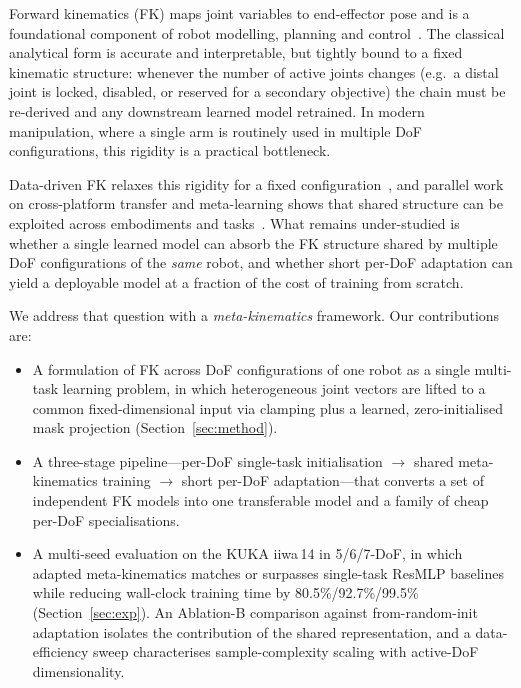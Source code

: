 \documentclass[conference]{IEEEtran}
\begin{document}
Forward kinematics (FK) maps joint variables to end-effector pose and is a foundational component of robot modelling, planning and control~\cite{siciliano2009}. The classical analytical form is accurate and interpretable, but tightly bound to a fixed kinematic structure: whenever the number of active joints changes (e.g.\ a distal joint is locked, disabled, or reserved for a secondary objective) the chain must be re-derived and any downstream learned model retrained. In modern manipulation, where a single arm is routinely used in multiple DoF configurations, this rigidity is a practical bottleneck.

Data-driven FK relaxes this rigidity for a fixed configuration~\cite{duka2014,koker2004,diprasetya2025}, and parallel work on cross-platform transfer and meta-learning shows that shared structure can be exploited across embodiments and tasks~\cite{devin2017,chen2018,ghadirzadeh2021}. What remains under-studied is whether a single learned model can absorb the FK structure shared by multiple DoF configurations of the \emph{same} robot, and whether short per-DoF adaptation can yield a deployable model at a fraction of the cost of training from scratch.

We address that question with a \emph{meta-kinematics} framework. Our contributions are:
\begin{itemize}
    \item A formulation of FK across DoF configurations of one robot as a single multi-task learning problem, in which heterogeneous joint vectors are lifted to a common fixed-dimensional input via clamping plus a learned, zero-initialised mask projection (Section~\ref{sec:method}).
    \item A three-stage pipeline---per-DoF single-task initialisation $\rightarrow$ shared meta-kinematics training $\rightarrow$ short per-DoF adaptation---that converts a set of independent FK models into one transferable model and a family of cheap per-DoF specialisations.
    \item A multi-seed evaluation on the KUKA iiwa\,14 in 5/6/7-DoF, in which adapted meta-kinematics matches or surpasses single-task ResMLP baselines while reducing wall-clock training time by 80.5\%/92.7\%/99.5\% (Section~\ref{sec:exp}). An Ablation-B comparison against from-random-init adaptation isolates the contribution of the shared representation, and a data-efficiency sweep characterises sample-complexity scaling with active-DoF dimensionality.
\end{itemize}
\end{document}
